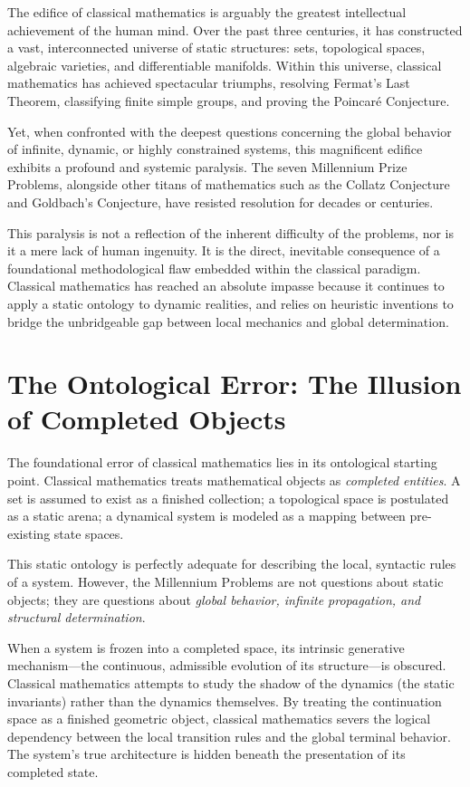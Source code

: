 \documentclass[12pt,openany]{extbook}
\theoremstyle{plain}
\theoremstyle{definition}
\begin{document}
The edifice of classical mathematics is arguably the greatest intellectual achievement of the human mind. Over the past three centuries, it has constructed a vast, interconnected universe of static structures: sets, topological spaces, algebraic varieties, and differentiable manifolds. Within this universe, classical mathematics has achieved spectacular triumphs, resolving Fermat's Last Theorem, classifying finite simple groups, and proving the Poincar\'{e} Conjecture. 

Yet, when confronted with the deepest questions concerning the global behavior of infinite, dynamic, or highly constrained systems, this magnificent edifice exhibits a profound and systemic paralysis. The seven Millennium Prize Problems, alongside other titans of mathematics such as the Collatz Conjecture and Goldbach's Conjecture, have resisted resolution for decades or centuries. 

This paralysis is not a reflection of the inherent difficulty of the problems, nor is it a mere lack of human ingenuity. It is the direct, inevitable consequence of a foundational methodological flaw embedded within the classical paradigm. Classical mathematics has reached an absolute impasse because it continues to apply a static ontology to dynamic realities, and relies on heuristic inventions to bridge the unbridgeable gap between local mechanics and global determination.

\section{The Ontological Error: The Illusion of Completed Objects}

The foundational error of classical mathematics lies in its ontological starting point. Classical mathematics treats mathematical objects as \emph{completed entities}. A set is assumed to exist as a finished collection; a topological space is postulated as a static arena; a dynamical system is modeled as a mapping between pre-existing state spaces. 

This static ontology is perfectly adequate for describing the local, syntactic rules of a system. However, the Millennium Problems are not questions about static objects; they are questions about \emph{global behavior, infinite propagation, and structural determination}. 

When a system is frozen into a completed space, its intrinsic generative mechanism---the continuous, admissible evolution of its structure---is obscured. Classical mathematics attempts to study the shadow of the dynamics (the static invariants) rather than the dynamics themselves. By treating the continuation space as a finished geometric object, classical mathematics severs the logical dependency between the local transition rules and the global terminal behavior. The system's true architecture is hidden beneath the presentation of its completed state.
\end{document}
